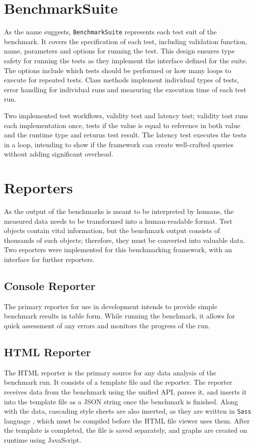 \section{BenchmarkSuite}

As the name suggests, \texttt{BenchmarkSuite} represents each test suit of the
benchmark. It covers the specification of each test, including validation
function, name, parameters and options for running the test. This design ensures
type safety for running the tests as they implement the interface defined for
the suite. The options include which tests should be performed or how many loops
to execute for repeated tests. Class methods implement individual types of
tests, error handling for individual runs and measuring the execution time of
each test run.

Two implemented test workflows, validity test and latency test; validity test
runs each implementation once, tests if the value is equal to reference in both
value and the runtime type and returns test result. The latency test executes
the tests in a loop, intending to show if the framework can create well-crafted
queries without adding significant overhead.

\section{Reporters}
As the output of the benchmarks is meant to be interpreted by humans, the
measured data needs to be transformed into a human-readable format. Test objects
contain vital information, but the benchmark output consists of thousands of
such objects; therefore, they must be converted into valuable data. Two
reporters were implemented for this benchmarking framework, with an interface
for further reporters.

\subsection{Console Reporter}
The primary reporter for use in development intends to provide simple benchmark
results in table form. While running the benchmark, it allows for quick
assessment of any errors and monitors the progress of the run.

\subsection{HTML Reporter}
The HTML reporter is the primary source for any data analysis of the benchmark
run. It consists of a template file and the reporter. The reporter receives data
from the benchmark using the unified API, parses it, and inserts it into the
template file as a JSON string once the benchmark is finished. Along with the
data, cascading style sheets are also inserted, as they are written in
\texttt{Sass} language \cite{Sass}, which must be compiled before the HTML file
viewer uses them. After the template is completed, the file is saved separately,
and graphs are created on runtime using JavaScript.

